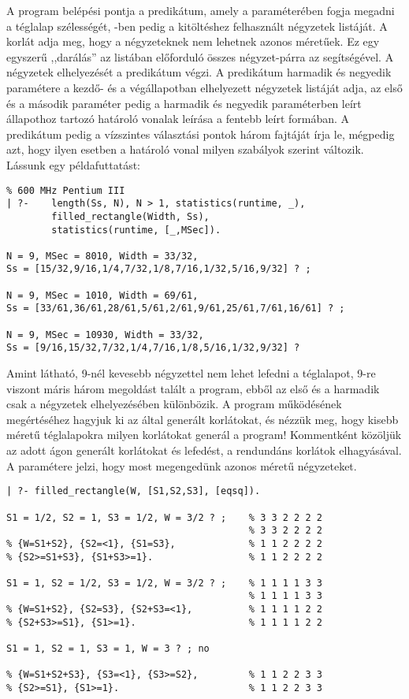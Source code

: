 A program belépési pontja a  predikátum, amely
a  paraméterében fogja megadni a téglalap szélességét, -ben
pedig a kitöltéshez felhasznált négyzetek listáját. A 
korlát adja meg, hogy a négyzeteknek nem lehetnek azonos méretűek. Ez egy
egyszerű ,,darálás'' az  listában előforduló összes négyzet-párra
az  segítségével. A négyzetek elhelyezését a 
predikátum végzi. A predikátum harmadik és negyedik paramétere a kezdő-
és a végállapotban elhelyezett négyzetek listáját adja, az első és a második
paraméter pedig a harmadik és negyedik paraméterben leírt állapothoz tartozó
határoló vonalak leírása a fentebb leírt formában. A 
predikátum pedig a vízszintes választási pontok három fajtáját írja le,
mégpedig azt, hogy ilyen esetben a határoló vonal milyen szabályok szerint
változik.
\br
Lássunk egy példafuttatást:
\begin{verbatim}
% 600 MHz Pentium III
| ?-    length(Ss, N), N > 1, statistics(runtime, _),
        filled_rectangle(Width, Ss), 
        statistics(runtime, [_,MSec]).

N = 9, MSec = 8010, Width = 33/32,
Ss = [15/32,9/16,1/4,7/32,1/8,7/16,1/32,5/16,9/32] ? ;

N = 9, MSec = 1010, Width = 69/61,
Ss = [33/61,36/61,28/61,5/61,2/61,9/61,25/61,7/61,16/61] ? ;

N = 9, MSec = 10930, Width = 33/32,
Ss = [9/16,15/32,7/32,1/4,7/16,1/8,5/16,1/32,9/32] ? 
\end{verbatim}
Amint látható, 9-nél kevesebb négyzettel nem lehet lefedni a téglalapot,
9-re viszont máris három megoldást talált a program, ebből az első és
a harmadik csak a négyzetek elhelyezésében különbözik.
\br
A program működésének megértéséhez hagyjuk ki az  által
generált korlátokat, és nézzük meg, hogy kisebb méretű téglalapokra milyen
korlátokat generál a program! Kommentként közöljük az adott ágon generált
korlátokat és lefedést, a rendundáns korlátok elhagyásával. A
 \cd{[eqsq]} paramétere jelzi, hogy most megengedünk
azonos méretű négyzeteket.
\begin{verbatim}
| ?- filled_rectangle(W, [S1,S2,S3], [eqsq]).

S1 = 1/2, S2 = 1, S3 = 1/2, W = 3/2 ? ;    % 3 3 2 2 2 2
                                           % 3 3 2 2 2 2
% {W=S1+S2}, {S2=<1}, {S1=S3},             % 1 1 2 2 2 2
% {S2>=S1+S3}, {S1+S3>=1}.                 % 1 1 2 2 2 2

S1 = 1, S2 = 1/2, S3 = 1/2, W = 3/2 ? ;    % 1 1 1 1 3 3
                                           % 1 1 1 1 3 3
% {W=S1+S2}, {S2=S3}, {S2+S3=<1},          % 1 1 1 1 2 2
% {S2+S3>=S1}, {S1>=1}.                    % 1 1 1 1 2 2

S1 = 1, S2 = 1, S3 = 1, W = 3 ? ; no

% {W=S1+S2+S3}, {S3=<1}, {S3>=S2},         % 1 1 2 2 3 3 
% {S2>=S1}, {S1>=1}.                       % 1 1 2 2 3 3 
\end{verbatim}

